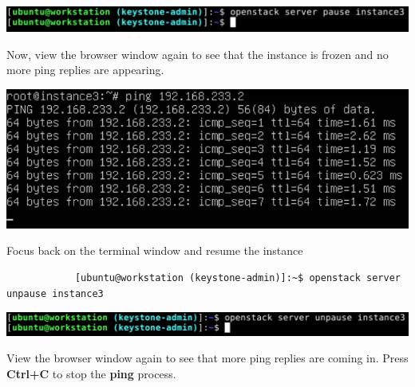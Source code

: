 \documentclass[letterpaper, 12pt]{article}
\begin{document}
\begin{enumerate}
\begin{labstep}
        \begin{center}
            \includegraphics[width=\linewidth]{images/part4/step5.png}
        \end{center}
    \end{labstep}

    \begin{labstep}
        Now, view the browser window again to see that the instance is frozen and no more ping replies are appearing.

        \begin{center}
            \includegraphics[width=\linewidth]{images/part4/step6.png}
        \end{center}
    \end{labstep}

    \begin{labstep}
        Focus back on the terminal window and resume the instance
        \begin{lstlisting}
            [ubuntu@workstation (keystone-admin)]:~$ openstack server unpause instance3
        \end{lstlisting}

        \begin{center}
            \includegraphics[width=\linewidth]{images/part4/step7.png}
        \end{center}
    \end{labstep}

    \begin{labstep}
        View the browser window again to see that more ping replies are coming in.
        Press \textbf{Ctrl+C} to stop the \textbf{ping} process.


\end{labstep}
\end{enumerate}
\end{document}

